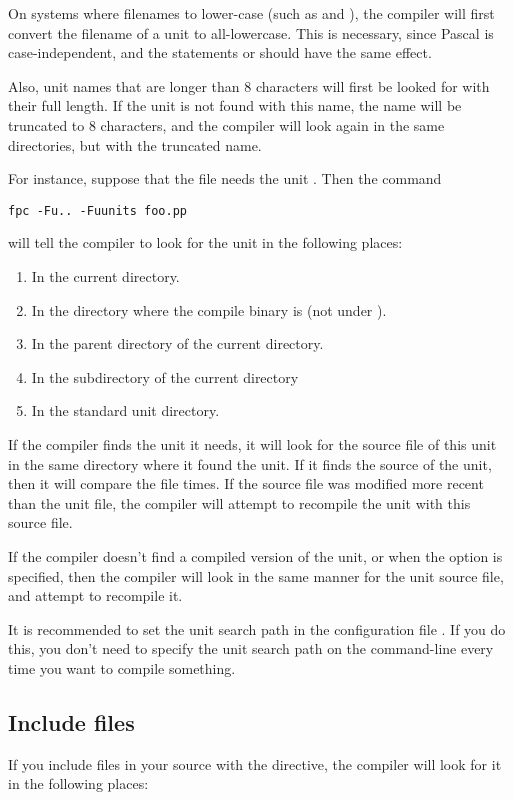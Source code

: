 On systems where filenames to lower-case (such as \unix and \linux), the compiler 
will first convert the filename of a unit to all-lowercase. This is necessary, 
since Pascal is case-independent, and the statements  or 
 should have the same effect.

Also, unit names that are longer than 8 characters will first be looked for
with their full length. If the unit is not found with this name, the name
will be truncated to 8 characters, and the compiler will look again in the
same directories, but with the truncated name.

For instance, suppose that the file  needs the unit
. Then the command
\begin{verbatim}
fpc -Fu.. -Fuunits foo.pp
\end{verbatim}
will tell the compiler to look for the unit  in the following
places:
\begin{enumerate}
\item In the current directory.
\item In the directory where the compile binary is (not under \linux).
\item In the parent directory of the current directory.
\item In the subdirectory  of the current directory
\item In the standard unit directory.
\end{enumerate}

If the compiler finds the unit it needs, it will look for the source file of
this unit in the same directory where it found the unit.
If it finds the source of the unit, then it will compare the file times.
If the source file was modified more recent than the unit file, the
compiler will attempt to recompile the unit with this source file.

If the compiler doesn't find a compiled version of the unit, or when the
 option is specified, then the compiler will look in the same
manner for the unit source file, and attempt to recompile it.

It is recommended to set the unit search path in the configuration file
. If you do this, you don't need to specify the unit search
path on the command-line every time you want to compile something.

\subsection{Include files}
If you include files in your source with the 
directive, the compiler will look for it in the following places:

